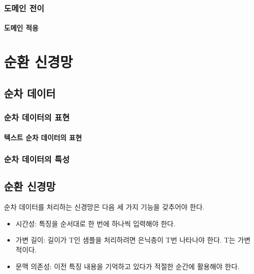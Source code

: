 \documentclass [12pt] {oblivoir}
\let\oldsubsubsection=\subsubsection
\renewcommand{\subsubsection}
{
  \filbreak
  \oldsubsubsection
}
\begin{document}
\vspace{3mm}

\subsubsection{도메인 전이}

\paragraph*{도메인 적응}\mbox{}

\vspace{3mm}

\newpage
\section{순환 신경망}

\subsection{순차 데이터}

\subsubsection{순차 데이터의 표현}

\paragraph*{텍스트 순차 데이터의 표현}\mbox{}

\vspace{3mm}

\subsubsection{순차 데이터의 특성}

\subsection{순환 신경망}

순차 데이터를 처리하는 신경망은 다음 세 가지 기능을 갖추어야 한다.

\begin{itemize}
  \item 시간성: 특징을 순서대로 한 번에 하나씩 입력해야 한다.
  \item 가변 길이: 길이가 T인 샘플을 처리하려면 은닉층이 T번 나타나야 한다. T는 가변적이다.
  \item 문맥 의존성: 이전 특징 내용을 기억하고 있다가 적절한 순간에 활용해야 한다.
\end{itemize}
\end{document}
